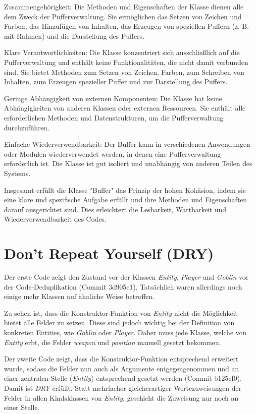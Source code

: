 Zusammengehörigkeit: Die Methoden und Eigenschaften der Klasse dienen
alle dem Zweck der Pufferverwaltung. Sie ermöglichen das Setzen von
Zeichen und Farben, das Hinzufügen von Inhalten, das Erzeugen von
speziellen Puffern (z. B. mit Rahmen) und die Darstellung des Puffers.

Klare Verantwortlichkeiten: Die Klasse konzentriert sich ausschließlich
auf die Pufferverwaltung und enthält keine Funktionalitäten, die nicht
damit verbunden sind. Sie bietet Methoden zum Setzen von Zeichen,
Farben, zum Schreiben von Inhalten, zum Erzeugen spezieller Puffer und
zur Darstellung des Puffers.

Geringe Abhängigkeit von externen Komponenten: Die Klasse hat keine
Abhängigkeiten von anderen Klassen oder externen Ressourcen. Sie
enthält alle erforderlichen Methoden und Datenstrukturen, um die
Pufferverwaltung durchzuführen.

Einfache Wiederverwendbarkeit: Der Buffer kann in verschiedenen
Anwendungen oder Modulen wiederverwendet werden, in denen eine
Pufferverwaltung erforderlich ist. Die Klasse ist gut isoliert und
unabhängig von anderen Teilen des Systems.

Insgesamt erfüllt die Klasse "Buffer" das Prinzip der hohen Kohäsion,
indem sie eine klare und spezifische Aufgabe erfüllt und ihre Methoden
und Eigenschaften darauf ausgerichtet sind. Dies erleichtert die
Lesbarkeit, Wartbarkeit und Wiederverwendbarkeit des Codes.
\fi

\section{Don't Repeat Yourself (DRY)}

Der erste Code zeigt den Zustand vor der Klassen \textit{Entity},
\textit{Player} und \textit{Goblin} vor der Code-Deduplikation 
(Commit 3d905e1). Tatsächlich waren allerdings noch einige mehr
Klassen auf ähnliche Weise betroffen.

Zu sehen ist, dass die Konstruktor-Funktion von \textit{Entity} nicht
die Möglichkeit bietet alle Felder zu setzen. Diese sind jedoch wichtig
bei der Definition von konkreten Entities, wie \textit{Goblin} oder
\textit{Player}. Daher muss jede Klasse, welche von \textit{Entity}
erbt, die Felder \textit{weapon} und \textit{position} manuell
gesetzt bekommen.

Der zweite Code zeigt, dass die Konstruktor-Funktion entsprechend
erweitert wurde, sodass die Felder nun auch als Argumente entgegengenommen
und an einer zentralen Stelle (\textit{Entity}) entsprechend gesetzt
werden (Commit b125cf0). Damit ist \textit{DRY} erfüllt. Statt
mehrfacher gleicherartiger Wertezuweisungen der Felder in allen
Kindsklassen von \textit{Entity}, geschieht die Zuweisung nur noch an
einer Stelle. 


